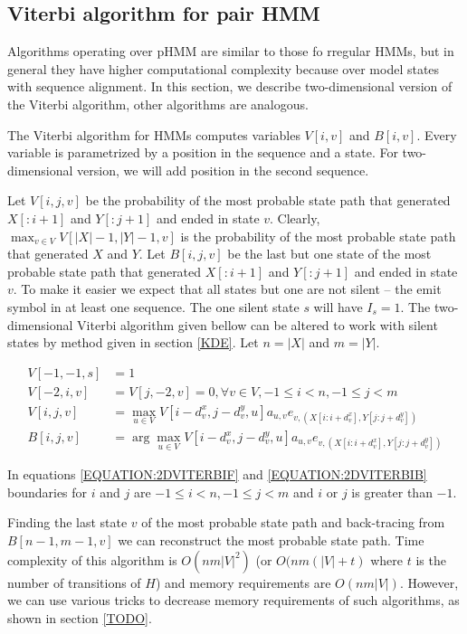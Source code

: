 \subsection{Viterbi algorithm for pair HMM}

Algorithms operating over  pHMM are similar to those fo rregular HMMs, but in
general they have higher computational complexity because over model states with
sequence alignment.
In this section, we describe two-dimensional version of the Viterbi algorithm,
other algorithms are analogous.

The Viterbi algorithm for HMMs computes variables $V[i,v]$ and $B[i,v]$. Every
variable is parametrized by a position in the sequence and a state. For
two-dimensional version, we will add position in the second sequence.

Let $V[i,j,v]$ be the probability of the most probable state path that generated
$X[:i+1]$ and $Y[:j+1]$ and ended in state $v$. Clearly, $\max_{v\in
V}V[|X|-1,|Y|-1,v]$ is the probability of the most probable state path that
generated $X$ and $Y$. Let $B[i,j,v]$ be the last but one state of the most
probable state path that generated $X[:i+1]$ and $Y[:j+1]$ and ended in state
$v$. To make it easier we expect that all states but one are not silent -- the emit
symbol in at least one sequence. The one silent state $s$ will have $I_s=1$.
The two-dimensional Viterbi algorithm given bellow can be altered to work with
silent states by method given in section \ref{KDE}. Let $n=|X|$ and $m=|Y|$.

\begin{align}
V[-1,-1,s] &= 1\\
V[-2,i,v] &= V[j,-2,v] = 0, \forall v\in V,-1 \leq i < n, -1\leq j < m\\
V[i,j,v] &= \max_{u\in
V}V[i-d^x_{v},j-d^y_v,u]a_{u,v}e_{v,(X[i:i+d^x_v],Y[j:j+d^y_v])}\label{EQUATION:2DVITERBIF}\\
B[i,j,v] &= \arg\max_{u\in
V}V[i-d^x_{v},j-d^y_v,u]a_{u,v}e_{v,(X[i:i+d^x_v],Y[j:j+d^y_v])}\label{EQUATION:2DVITERBIB}
\end{align}

In equations \ref{EQUATION:2DVITERBIF} and \ref{EQUATION:2DVITERBIB} boundaries for $i$ and $j$ are $
-1\leq i< n,-1\leq j< m$ and $i$ or $j$ is greater than $-1$.


Finding the last state $v$ of the most probable state path and back-tracing from
$B[n-1,m-1,v]$ we can reconstruct the most probable state path. Time
complexity of this algorithm is $O(nm|V|^2)$ (or $O(nm(|V|+t)$ where $t$
is the number of transitions of $H$) and memory requirements are
$O(nm|V|)$. However, we can use various tricks to decrease memory
requirements of such algorithms, as shown in section \ref{TODO}.


